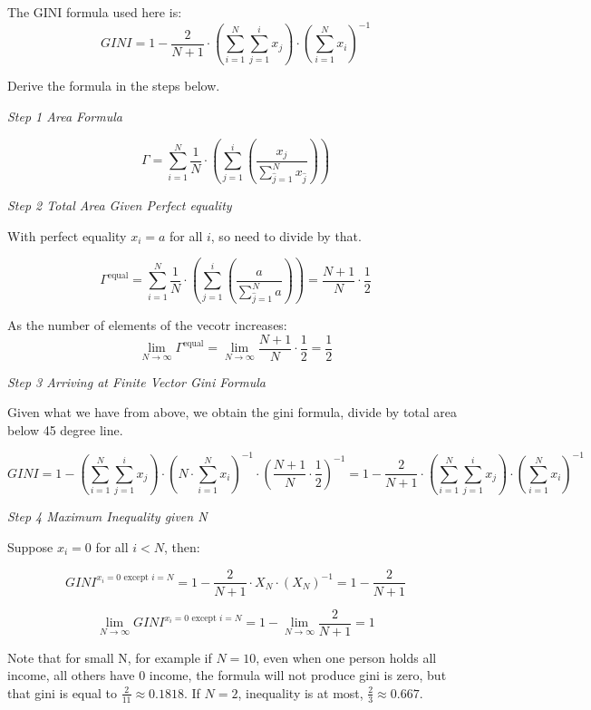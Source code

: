 \documentclass[
]{book}
\begin{document}
The GINI formula used here is:
\[
 GINI =
  1 - \frac{2}{N+1}
  \cdot
  \left(\sum_{i=1}^N \sum_{j=1}^{i} x_j\right)
  \cdot
  \left(
    \sum_{i=1}^N x_i
  \right)^{-1}
\]

Derive the formula in the steps below.

\emph{Step 1 Area Formula}

\[
 \Gamma = \sum_{i=1}^N \frac{1}{N} \cdot \left(
     \sum_{j=1}^{i} \left(
      \frac{x_j}{\sum_{\widehat{j}=1}^N x_{\widehat{j}} }
      \right)
  \right)
\]

\emph{Step 2 Total Area Given Perfect equality}

With perfect equality \(x_i=a\) for all \(i\), so need to divide by that.

\[
 \Gamma^{\text{equal}} = \sum_{i=1}^N \frac{1}{N} \cdot \left(
     \sum_{j=1}^{i} \left(
      \frac{a}{\sum_{\widehat{j}=1}^N a }
      \right)
  \right)
  = \frac{N+1}{N}\cdot\frac{1}{2}
\]

As the number of elements of the vecotr increases:
\[
 \lim_{N \rightarrow \infty}\Gamma^{\text{equal}}
  = \lim_{N \rightarrow \infty} \frac{N+1}{N}\cdot\frac{1}{2}
  = \frac{1}{2}
\]

\emph{Step 3 Arriving at Finite Vector Gini Formula}

Given what we have from above, we obtain the gini formula, divide by total area below 45 degree line.

\[
 GINI =
  1 -
  \left(\sum_{i=1}^N \sum_{j=1}^{i} x_j\right)
  \cdot
  \left(
    N \cdot \sum_{i=1}^N x_i
  \right)^{-1}
  \cdot
  \left( \frac{N+1}{N}\cdot\frac{1}{2} \right)^{-1}
  =
  1 - \frac{2}{N+1}
  \cdot
  \left(\sum_{i=1}^N \sum_{j=1}^{i} x_j\right)
  \cdot
  \left(
    \sum_{i=1}^N x_i
  \right)^{-1}
\]

\emph{Step 4 Maximum Inequality given N}

Suppose \(x_i=0\) for all \(i<N\), then:

\[
 GINI^{x_i = 0 \text{ except } i=N}
 =
  1 - \frac{2}{N+1}
  \cdot
  X_N
  \cdot
  \left(
    X_N
  \right)^{-1}
 =
 1 - \frac{2}{N+1}
\]

\[
 \lim_{N \rightarrow \infty} GINI^{x_i = 0 \text{ except } i=N}
 =
 1 -
 \lim_{N \rightarrow \infty}
 \frac{2}{N+1}
 = 1
\]

Note that for small N, for example if \(N=10\), even when one person holds all income, all others have 0 income, the formula will not produce gini is zero, but that gini is equal to \(\frac{2}{11}\approx 0.1818\). If \(N=2\), inequality is at most, \(\frac{2}{3}\approx 0.667\).
\end{document}
